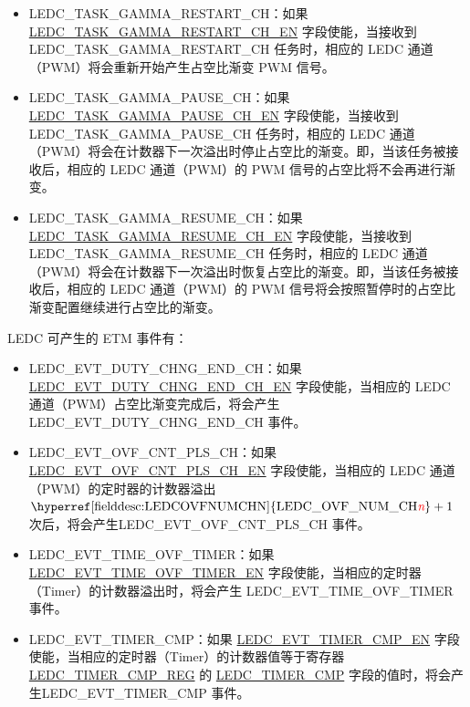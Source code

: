 \documentclass[main\_\_CN.tex]{subfiles}
\begin{document}
\begin{itemize}
\item LEDC\_TASK\_GAMMA\_RESTART\_CH：如果 \hyperref[fielddesc:LEDCTASKGAMMARESTARTCHNEN]{LEDC\_TASK\_GAMMA\_RESTART\_CH\_EN} 字段使能，当接收到 LEDC\_TASK\_GAMMA\_RESTART\_CH 任务时，相应的 LEDC 通道（PWM）将会重新开始产生占空比渐变 PWM 信号。
\item LEDC\_TASK\_GAMMA\_PAUSE\_CH：如果 \hyperref[fielddesc:LEDCTASKGAMMAPAUSECHNEN]{LEDC\_TASK\_GAMMA\_PAUSE\_CH\_EN} 字段使能，当接收到 LEDC\_TASK\_GAMMA\_PAUSE\_CH 任务时，相应的 LEDC 通道（PWM）将会在计数器下一次溢出时停止占空比的渐变。即，当该任务被接收后，相应的 LEDC 通道（PWM）的 PWM 信号的占空比将不会再进行渐变。
\item LEDC\_TASK\_GAMMA\_RESUME\_CH：如果 \hyperref[fielddesc:LEDCTASKGAMMARESUMECHNEN]{LEDC\_TASK\_GAMMA\_RESUME\_CH\_EN} 字段使能，当接收到 LEDC\_TASK\_GAMMA\_RESUME\_CH 任务时，相应的 LEDC 通道（PWM）将会在计数器下一次溢出时恢复占空比的渐变。即，当该任务被接收后，相应的 LEDC 通道（PWM）的 PWM 信号将会按照暂停时的占空比渐变配置继续进行占空比的渐变。
\end{itemize}

LEDC 可产生的 ETM 事件有：

\begin{itemize}
    \item LEDC\_EVT\_DUTY\_CHNG\_END\_CH：如果 \hyperref[fielddesc:LEDCEVTDUTYCHNGENDCHNEN]{LEDC\_EVT\_DUTY\_CHNG\_END\_CH\_EN} 字段使能，当相应的 LEDC 通道（PWM）占空比渐变完成后，将会产生 LEDC\_EVT\_DUTY\_CHNG\_END\_CH 事件。
    \item LEDC\_EVT\_OVF\_CNT\_PLS\_CH：如果 \hyperref[fielddesc:LEDCEVTOVFCNTPLSCHNEN]{LEDC\_EVT\_OVF\_CNT\_PLS\_CH\_EN} 字段使能，当相应的 LEDC 通道（PWM）的定时器的计数器溢出$ \textrm{\hyperref[fielddesc:LEDCOVFNUMCHN]{LEDC\_OVF\_NUM\_CH\regindex{n}}} + 1 $ 次后，将会产生LEDC\_EVT\_OVF\_CNT\_PLS\_CH 事件。
    \item LEDC\_EVT\_TIME\_OVF\_TIMER：如果 \hyperref[fielddesc:LEDCEVTTIMEOVFTIMERNEN]{LEDC\_EVT\_TIME\_OVF\_TIMER\_EN} 字段使能，当相应的定时器（Timer）的计数器溢出时，将会产生 LEDC\_EVT\_TIME\_OVF\_TIMER 事件。
    \item LEDC\_EVT\_TIMER\_CMP：如果 \hyperref[fielddesc:LEDCEVTTIMERNCMPEN]{LEDC\_EVT\_TIMER\_CMP\_EN} 字段使能，当相应的定时器（Timer）的计数器值等于寄存器 \hyperref[regdesc:LEDCTIMERNCMPREG]{LEDC\_TIMER\_CMP\_REG} 的 \hyperref[fielddesc:LEDCTIMERNCMP]{LEDC\_TIMER\_CMP} 字段的值时，将会产生LEDC\_EVT\_TIMER\_CMP 事件。
\end{itemize}
\end{document}
